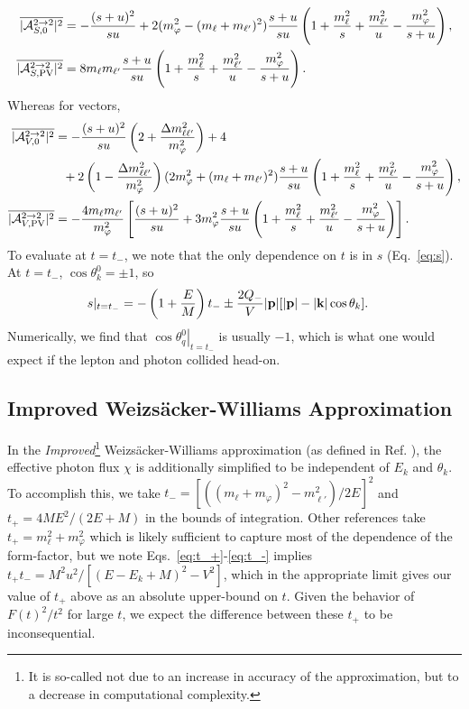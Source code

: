 \begin{align}
    \overline{|{\cal A}_{S,0}^{2\rightarrow2}|^2} &= -\frac{(s+u)^2}{su} + 2(m_\varphi^2 - (m_\ell + m_{\ell'})^2)\frac{s+u}{su}\left(1+\frac{m_\ell^2}{s}+\frac{m_{\ell'}^2}{u}-\frac{m_\varphi^2}{s+u}\right),\nonumber\\
    \overline{|{\cal A}_{S,{\rm PV}}^{2\rightarrow2}|^2} &= 8m_\ell m_{\ell'}\frac{s+u}{su}\left(1+\frac{m_\ell^2}{s}+\frac{m_{\ell'}^2}{u}-\frac{m_\varphi^2}{s+u}\right).\label{eq:scalar_amplitudes_2_2}
\end{align}
Whereas for vectors,
\begin{align}
    \overline{|{\cal A}_{V,0}^{2\rightarrow2}|^2} &= -\frac{(s+u)^2}{su}\left(2+\frac{\Delta m_{\ell\ell'}^2}{m_\varphi^2}\right) + 4\nonumber\\
    &\ \ + 2\left(1-\frac{\Delta m_{\ell\ell'}^2}{m_\varphi^2}\right)(2m_\varphi^2 + (m_\ell + m_{\ell'})^2)\frac{s+u}{su}\left(1+\frac{m_\ell^2}{s}+\frac{m_{\ell'}^2}{u}-\frac{m_\varphi^2}{s+u}\right),\nonumber\\
    \overline{|{\cal A}_{V,{\rm PV}}^{2\rightarrow2}|^2} &= -\frac{4m_\ell m_{\ell'}}{m_\varphi^2}\left[\frac{(s+u)^2}{su}+3m_\varphi^2\frac{s+u}{su}\left(1+\frac{m_\ell^2}{s}+\frac{m_{\ell'}^2}{u}-\frac{m_\varphi^2}{s+u}\right)\right].\label{eq:vector_amplitudes_2_2}
\end{align}
To evaluate at $t = t_-$, we note that the only dependence on $t$ is in $s$  (Eq.~\ref{eq:s}). At $t = t_-$, $\cos{\theta_k^0} = \pm 1$, so 
\begin{align}
    s|_{t=t_-} &= -\left(1+\frac{E}{M}\right)t_- \pm \frac{2Q_-}{V}|{\bf p}|[|{\bf p}| - |{\bf k}|\cos{\theta_k}].
\end{align}
Numerically, we find that $\left.\cos{\theta_q^0}\right|_{t=t_-}$ is usually $-1$, which is what one would expect if the lepton and photon collided head-on. 

\subsection{Improved Weizs\"acker-Williams Approximation}\label{sec:IWW}
In the {\it Improved}\footnote{It is so-called not due to an increase in accuracy of the approximation, but to a decrease in computational complexity.} Weizs\"acker-Williams approximation (as defined in Ref. \cite{Kim:1973he}), the effective photon flux $\chi$ is additionally simplified to be independent of $E_k$ and $\theta_k$. To accomplish this, we take $t_- = [((m_\ell + m_\varphi)^2 - m_{\ell'}^2)/2E]^2$ and $t_+ = 4ME^2/(2E+M)$ in the bounds of integration. Other references take $t_+ = m_\ell^2 + m_\varphi^2$ which is likely sufficient to capture most of the dependence of the form-factor, but we note Eqs.~\ref{eq:t_+}-\ref{eq:t_-} implies $t_+t_- = M^2u^2/[(E-E_k+M)^2-V^2]$, which in the appropriate limit gives our value of $t_+$ above as an absolute upper-bound on $t$. Given the behavior of $F(t)^2/t^2$ for large $t$, we expect the difference between these $t_+$ to be inconsequential.


